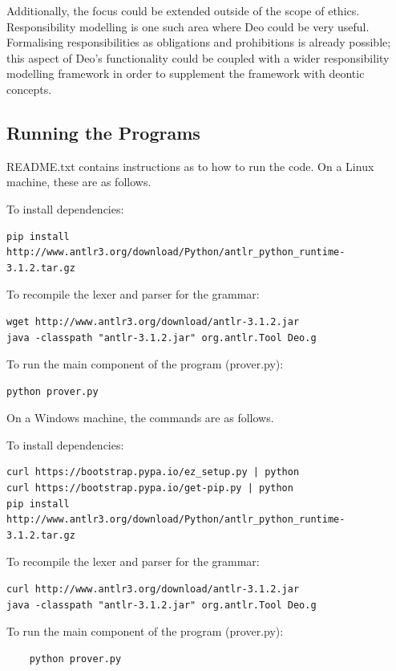 \documentclass{l4proj}
\begin{document}
Additionally, the focus could be extended outside of the scope of ethics. Responsibility modelling is one such area where Deo could be very useful. Formalising responsibilities as obligations and prohibitions is already possible; this aspect of Deo's functionality could be coupled with a wider responsibility modelling framework in order to supplement the framework with deontic concepts. 

\begin{appendices}
\chapter{Running the Programs}
README.txt contains instructions as to how to run the code. On a Linux machine, these are as follows. 

To install dependencies: 
\begin{verbatim}
pip install http://www.antlr3.org/download/Python/antlr_python_runtime-3.1.2.tar.gz
\end{verbatim}
To recompile the lexer and parser for the grammar: 
\begin{verbatim}
wget http://www.antlr3.org/download/antlr-3.1.2.jar
java -classpath "antlr-3.1.2.jar" org.antlr.Tool Deo.g
\end{verbatim}
To run the main component of the program (prover.py): 
\begin{verbatim}
python prover.py
\end{verbatim}

On a Windows machine, the commands are as follows. 

To install dependencies: 
\begin{verbatim}
curl https://bootstrap.pypa.io/ez_setup.py | python
curl https://bootstrap.pypa.io/get-pip.py | python
pip install http://www.antlr3.org/download/Python/antlr_python_runtime-3.1.2.tar.gz
\end{verbatim}

To recompile the lexer and parser for the grammar: 
\begin{verbatim}
curl http://www.antlr3.org/download/antlr-3.1.2.jar
java -classpath "antlr-3.1.2.jar" org.antlr.Tool Deo.g
\end{verbatim}

To run the main component of the program (prover.py): 
\begin{verbatim}
	python prover.py
\end{verbatim}


\end{appendices}
\end{document}
